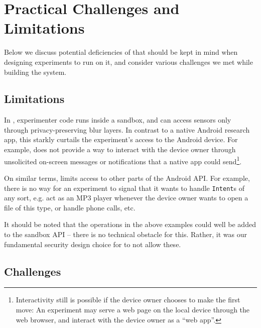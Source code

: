 \section{Practical Challenges and Limitations}\label{sec-limitation}

Below we discuss potential deficiencies of \sysname 
that should be kept in mind when designing experiments to run on it, 
and consider various challenges we met while building the system.

\subsection{Limitations}\label{subsec-limitations}
In \sysname, experimenter code runs inside a sandbox, and 
can access sensors only through privacy-preserving blur layers. 
In contrast to a native Android research app, this starkly curtails 
the experiment's access to the Android device. For example, \sysname 
does not provide a way to interact with the device owner 
through unsolicited on-screen messages or notifications that a native 
app could send\footnote{Interactivity still is possible if the device 
owner chooses to make the first move: An experiment may serve a web 
page on the local device through the web browser, and interact with 
the device owner as a ``web app''.}. 

On similar terms, \sysname limits access to other parts 
of the Android API. For example, there is no way for an experiment to 
signal that it wants to handle \texttt{Intent}s of any sort, e.g. 
act as an MP3 player whenever the device owner wants to open a file 
of this type, or handle phone calls, etc.

It should be noted that the operations in the above examples 
could well be added to the sandbox API -- there is no technical 
obstacle for this. Rather, it was our fundamental security design 
choice for \sysname to not allow these.


\subsection{Challenges}\label{subsec-challenges}

